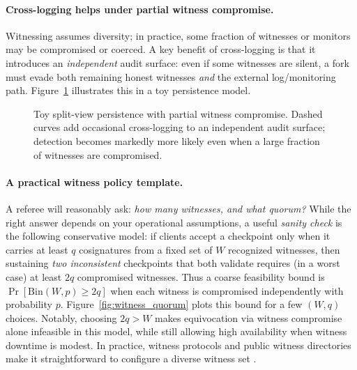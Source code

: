 \documentclass[11pt]{article}
\begin{document}
\paragraph{Cross-logging helps under partial witness compromise.}
Witnessing assumes diversity; in practice, some fraction of witnesses or monitors may be compromised or coerced.
A key benefit of cross-logging is that it introduces an \emph{independent} audit surface: even if some witnesses are silent,
a fork must evade both remaining honest witnesses \emph{and} the external log/monitoring path.
Figure~\ref{fig:crosslog_comp} illustrates this in a toy persistence model.

\begin{figure}[t]
\centering
{}
\caption{Toy split-view persistence with partial witness compromise.
Dashed curves add occasional cross-logging to an independent audit surface; detection becomes markedly more likely even when a large fraction of witnesses are compromised.}
\label{fig:crosslog_comp}

\end{figure}



\paragraph{A practical witness policy template.}
A referee will reasonably ask: \emph{how many witnesses, and what quorum?}
While the right answer depends on your operational assumptions, a useful \emph{sanity check} is the following conservative model:
if clients accept a checkpoint only when it carries at least $q$ cosignatures from a fixed set of $W$ recognized witnesses,
then sustaining \emph{two inconsistent} checkpoints that both validate requires (in a worst case) at least $2q$ compromised witnesses.
Thus a coarse feasibility bound is $\Pr[\mathrm{Bin}(W,p)\ge 2q]$ when each witness is compromised independently with probability $p$.
Figure~\ref{fig:witness_quorum} plots this bound for a few $(W,q)$ choices.
Notably, choosing $2q>W$ makes equivocation via witness compromise alone infeasible in this model, while still allowing high availability when witness downtime is modest.
In practice, witness protocols and public witness directories make it straightforward to configure a diverse witness set \cite{c2sp_tlog_witness}.
\end{document}
